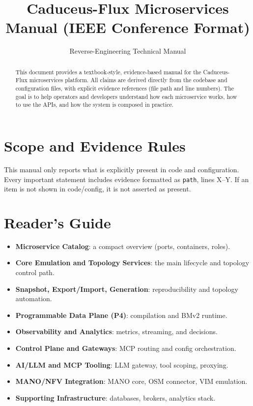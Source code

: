 \documentclass[conference]{IEEEtran}
\title{Caduceus-Flux Microservices Manual (IEEE Conference Format)}
\author{Reverse-Engineering Technical Manual}
\begin{document}
\maketitle

\begin{abstract}
This document provides a textbook-style, evidence-based manual for the Caduceus-Flux microservices platform. All claims are derived directly from the codebase and configuration files, with explicit evidence references (file path and line numbers). The goal is to help operators and developers understand how each microservice works, how to use the APIs, and how the system is composed in practice.
\end{abstract}

\section{Scope and Evidence Rules}
This manual only reports what is explicitly present in code and configuration. Every important statement includes evidence formatted as \texttt{path}, lines X--Y. If an item is not shown in code/config, it is not asserted as present.

\section{Reader's Guide}
\begin{itemize}
\item \textbf{Microservice Catalog}: a compact overview (ports, containers, roles).
\item \textbf{Core Emulation and Topology Services}: the main lifecycle and topology control path.
\item \textbf{Snapshot, Export/Import, Generation}: reproducibility and topology automation.
\item \textbf{Programmable Data Plane (P4)}: compilation and BMv2 runtime.
\item \textbf{Observability and Analytics}: metrics, streaming, and decisions.
\item \textbf{Control Plane and Gateways}: MCP routing and config orchestration.
\item \textbf{AI/LLM and MCP Tooling}: LLM gateway, tool scoping, proxying.
\item \textbf{MANO/NFV Integration}: MANO core, OSM connector, VIM emulation.
\item \textbf{Supporting Infrastructure}: databases, brokers, analytics stack.
\end{itemize}
\end{document}
